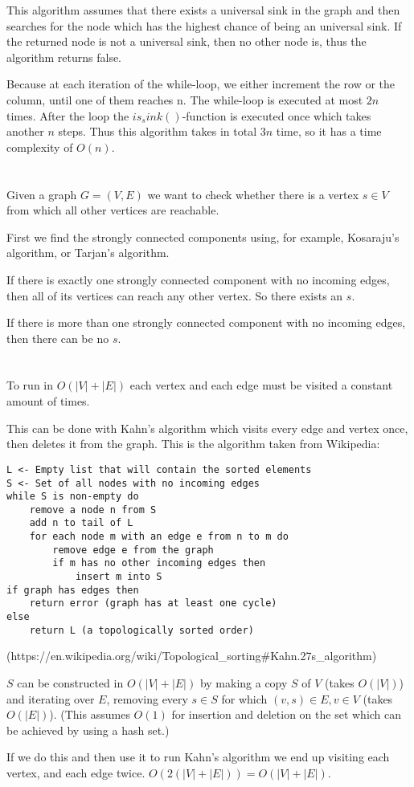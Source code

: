 \documentclass[12pt]{article}
\begin{document}
This algorithm assumes that there exists a universal sink in the graph and then searches for the node which has the highest chance of being an universal sink.
If the returned node is not a universal sink, then no other node is, thus the algorithm returns false.

Because at each iteration of the while-loop, we either increment the row or the column, until one of them reaches n. The while-loop is executed at most $2n$ times.
After the loop the $is_sink()$-function is executed once which takes another $n$ steps.
Thus this algorithm takes in total $3n$ time, so it has a time complexity of $O(n)$.

\section{} %
Given a graph $G = (V, E)$ we want to check whether there is a vertex $s \in V$ from which all other vertices are reachable.

First we find the strongly connected components using, for example, Kosaraju's algorithm, or Tarjan's algorithm.

If there is exactly one strongly connected component with no incoming edges, then all of its vertices can reach any other vertex. So there exists an $s$.

If there is more than one strongly connected component with no incoming edges, then there can be no $s$.

\section{} %
To run in $O(|V| + |E|)$ each vertex and each edge must be visited a constant amount of times.

This can be done with Kahn's algorithm which visits every edge and vertex once, then deletes it from the graph. This is the algorithm taken from Wikipedia:

\begin{lstlisting}
L <- Empty list that will contain the sorted elements
S <- Set of all nodes with no incoming edges
while S is non-empty do
    remove a node n from S
    add n to tail of L
    for each node m with an edge e from n to m do
        remove edge e from the graph
        if m has no other incoming edges then
            insert m into S
if graph has edges then
    return error (graph has at least one cycle)
else
    return L (a topologically sorted order)
\end{lstlisting}
(https://en.wikipedia.org/wiki/Topological\_sorting\#Kahn.27s\_algorithm)

$S$ can be constructed in $O(|V| + |E|)$ by making a copy $S$ of $V$ (takes $O(|V|)$) and iterating over $E$, removing every $s \in S$ for which $(v, s) \in E, v\in V$ (takes $O(|E|)$). (This assumes $O(1)$ for insertion and deletion on the set which can be achieved by using a hash set.)

If we do this and then use it to run Kahn's algorithm we end up visiting each vertex, and each edge twice. $O(2(|V| + |E|)) = O(|V| + |E|)$.
\end{document}
